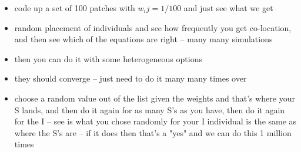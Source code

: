 \documentclass[11pt]{article}
\begin{document}
\begin{itemize}
    \item code up a set of 100 patches with $w_ij= 1/100$ and just see what we get 
    \item random placement of individuals and see how frequently you get co-location, and then see which of the equations are right -- many many simulations
    \item then you can do it with some heterogeneous options 
    \item they should converge -- just need to do it many many times over 
    \item choose a random value out of the list given the weights and that's where your S lands, and then do it again for as many S's as you have, then do it again for the I -- see is what you chose randomly for your I individual is the same as where the S's are -- if it does then that's a "yes" and we can do this 1 million times 
\end{itemize}
\end{document}
